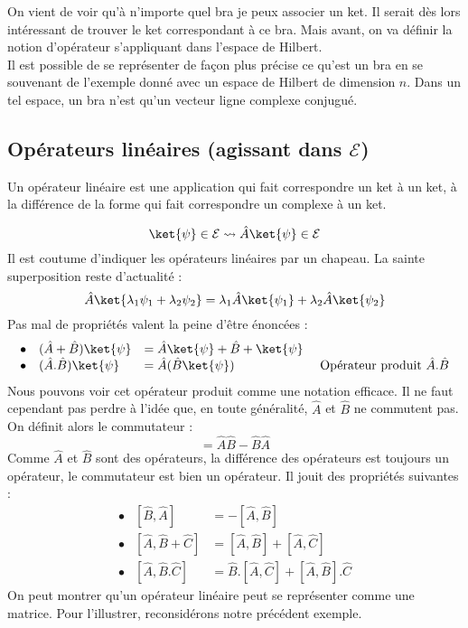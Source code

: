 On vient de voir qu'à n'importe quel bra je peux associer un ket. Il serait 
dès lors intéressant de trouver le ket correspondant à ce bra. Mais avant, on va définir 
la notion d'opérateur s'appliquant dans l'espace de Hilbert. \\

Il est possible de se représenter de façon plus précise ce qu'est un bra en 
se souvenant de l'exemple donné avec un espace de Hilbert de dimension $n$. Dans 
un tel espace, un bra n'est qu'un vecteur ligne complexe conjugué.

\subsection{Opérateurs linéaires (agissant dans $\mathcal{E}$)}
Un opérateur linéaire est une application qui fait correspondre un ket à un ket, à 
la différence de la forme qui fait correspondre un complexe à un ket.

\begin{equation}
\ket{\psi} \in \mathcal{E} \leadsto \hat{A}\ket{\psi} \in \mathcal{E}
\end{equation}
Il est coutume d'indiquer les opérateurs linéaires par un chapeau. La sainte 
superposition reste d'actualité :
\begin{equation}
\hat{A}\ket{\lambda_1\psi_1+\lambda_2\psi_2} = \lambda_1\hat{A}\ket{\psi_1}+
\lambda_2\hat{A}\ket{\psi_2}
\end{equation}
Pas mal de propriétés valent la peine d'être énoncées :
\begin{equation}
\begin{array}{llll}
\bullet & (\hat{A}+\hat{B})\ket{\psi} &= \hat{A}\ket{\psi}+\hat{B}+\ket{\psi}\\
\bullet & (\hat{A}.\hat{B})\ket{\psi} &= \hat{A}(\hat{B}\ket{\psi})\qquad & \text{ Opérateur 
produit $\hat{A}.\hat{B}$}
\end{array}
\end{equation}
Nous pouvons voir cet opérateur produit comme une notation efficace. Il ne faut 
cependant pas perdre à l'idée que, en toute généralité, $\hat{A}$ et $\hat{B}$ 
ne commutent pas. On définit alors le commutateur :
\begin{equation}
[\hat{A},\hat{B}] = \hat{A}\hat{B} - \hat{B}\hat{A}
\end{equation}
Comme $\hat{A}$ et $\hat{B}$ sont des opérateurs, la différence des opérateurs 
est toujours un opérateur, le commutateur est bien un opérateur. Il jouit des 
propriétés suivantes :
\begin{equation}
\begin{array}{lll}
\bullet & [\hat{B},\hat{A}] &= -[\hat{A},\hat{B}]\\
\bullet & [\hat{A},\hat{B}+\hat{C}] &= [\hat{A},\hat{B}]+[\hat{A},\hat{C}]\\
\bullet & [\hat{A},\hat{B}.\hat{C}] &= \hat{B}.[\hat{A},\hat{C}]+[\hat{A},
\hat{B}].\hat{C}
\end{array}
\end{equation}
On peut montrer qu'un opérateur linéaire peut se représenter comme une 
matrice. Pour l'illustrer, reconsidérons notre précédent exemple.\\

